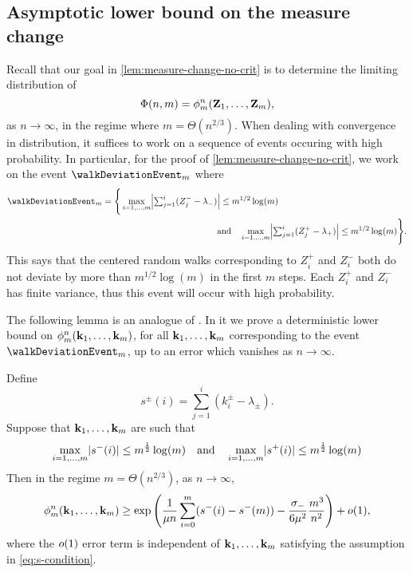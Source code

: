 \subsection{Asymptotic lower bound on the measure change}

Recall that our goal in \cref{lem:measure-change-no-crit} is to determine the limiting distribution of
\begin{equation*}
    \Phi(n, m) = \phi^n_m({\mathbf Z}_1, \ldots, {\mathbf Z}_m),
\end{equation*}
as $n \to \infty$, in the regime where $m = \Theta(n^{2/3})$. When dealing with convergence in distribution, it suffices to work on a sequence of events occuring with high probability. In particular, for the proof of \cref{lem:measure-change-no-crit}, we work on the event $\walkDeviationEvent_m$ where
\begin{align*}
    \walkDeviationEvent_m
    &= \Bigg\{ 
    \max_{i=1, \ldots, m } \abs*{
        \textstyle\sum_{j=1}^i (Z^{-}_j - \lambda_{-}) 
    } \leq m^{1/2} \log(m) \\
    &\hspace{13em} \text{and} \quad
    \max_{i=1, \ldots, m } \abs*{
        \textstyle\sum_{j=1}^i (Z^{+}_j - \lambda_{+}) 
    } \leq m^{1/2} \log(m)
    \Bigg\}.
\end{align*}
This says that the centered random walks corresponding to $Z^+_i$ and $Z^-_i$ both do not deviate by more than $m^{1/2} \log(m)$ in the first $m$ steps. Each $Z^+_i$ and $Z^-_i$ has finite variance, thus this event will occur with high probability. 

The following lemma is an analogue of \citet[Lemma 6.7]{conchon--kerjanStableGraphMetric2020}. In it we prove a deterministic lower bound on $\phi^n_m({\mathbf k}_1, \ldots, {\mathbf k}_m)$, for all ${\mathbf k}_1, \ldots, {\mathbf k}_m$ corresponding to the event $\walkDeviationEvent_m$, up to an error which vanishes as $n \to \infty$.
\begin{proposition}
    \label{prop:measure-change-approx}
    Define
    \begin{equation*}
        s^{\pm}(i) = \textstyle{\sum_{j=1}^i (k_i^{\pm} - \lambda_{\pm})}.
    \end{equation*}
    Suppose that ${\mathbf k}_1, \ldots, {\mathbf k}_m$ are such that
    \begin{equation}
        \label{eq:s-condition}
        \max_{i=1, \ldots, m} \lvert s^{-}(i)\rvert \leq m^{\frac{1}{2}} \log(m)
        \quad \text{and} \quad
        \max_{i=1, \ldots, m} \lvert s^{+}(i)\rvert \leq m^{\frac{1}{2}} \log(m)
    \end{equation}
    Then in the regime $m = \Theta(n^{2/3})$, as $n \to \infty$,
    \begin{equation*}
        \phi^n_m({\mathbf k}_1, \ldots, {\mathbf k}_m)
        \geq \exp\left( \frac{1}{\mu n} \sum_{i=0}^m (s^-(i) - s^-(m)) - \frac{\sigma_-}{6 \mu^2} \frac{m^3}{n^2} \right) + o(1),
    \end{equation*}
    where the $o(1)$ error term is independent of ${\mathbf k}_1, \ldots, {\mathbf k}_m$ satisfying the assumption in \cref{eq:s-condition}.
\end{proposition}


